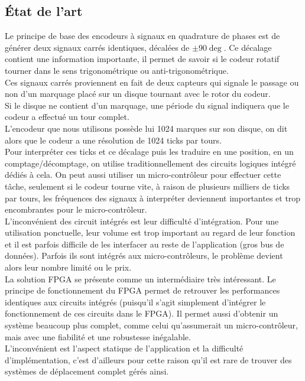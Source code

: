 \newpage
\subsection{\'Etat de l'art}
Le principe de base des encodeurs à signaux en quadrature de phases est de générer deux signaux carrés identiques, décalées de $\pm90\deg$. Ce décalage contient une information importante, il permet de savoir si le codeur rotatif tourner dans le sens trigonométrique ou anti-trigonométrique.\\

Ces signaux carrés proviennent en fait de deux capteurs qui signale le passage ou non d'un marquage placé sur un disque tournant avec le rotor du codeur. \\ Si le disque ne contient d'un marquage, une période du signal indiquera que le codeur a effectué un tour complet.\\
L'encodeur que nous utilisons possède lui 1024 marques sur son disque, on dit alors que le codeur a une résolution de 1024 ticks par tours.\\

Pour interpréter ces ticks et ce décalage puis les traduire en une position, en un comptage/décomptage, on utilise traditionnellement des circuits logiques intégré dédiés à cela. On peut aussi utiliser un micro-contrôleur pour effectuer cette t\^ache, seulement si le codeur tourne vite, à raison de plusieurs milliers de ticks par tours, les fréquences des signaux à interpréter deviennent importantes et trop encombrantes pour le micro-contrôleur.\\
L'inconvénient des circuit intégrés est leur difficulté d'intégration. Pour une utilisation ponctuelle, leur volume est trop important au regard de leur fonction et il est parfois difficile de les interfacer au reste de l'application (gros bus de données). Parfois ils sont intégrés aux micro-contrôleurs, le problème devient alors leur nombre limité ou le prix.\\
La solution FPGA se présente comme un intermédiaire très intéressant. Le principe de fonctionnement du FPGA permet de retrouver les performances identiques aux circuits intégrés (puisqu'il s'agit simplement d'intégrer le fonctionnement de ces circuits dans le FPGA). Il permet aussi d'obtenir un système beaucoup plus complet, comme celui qu'assumerait un micro-contrôleur, mais avec une fiabilité et une robustesse inégalable.\\
L'inconvénient est l'aspect statique de l'application et la difficulté d'implémentation, c'est d'ailleurs pour cette raison qu'il est rare de trouver des systèmes de déplacement complet gérés ainsi.\\